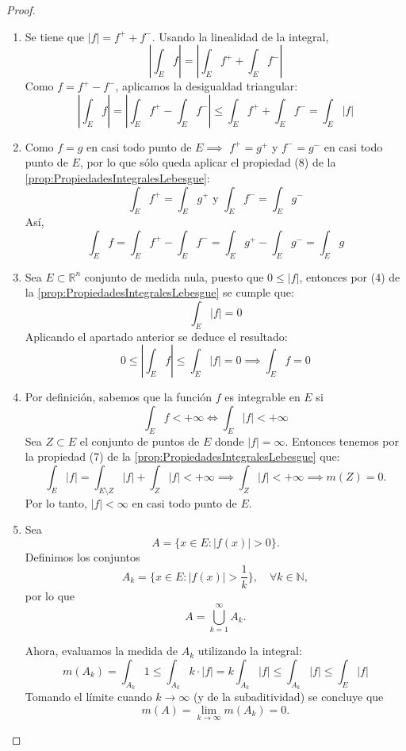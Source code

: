 \begin{proof}
\begin{enumerate}
        \item Se tiene que $|f| = f^+ + f^-$. Usando la linealidad de la integral, $$ \left|\int_E
                  f\right| = \left|\int_E f^+ + \int_E f^- \right| $$ Como $f = f^+ - f^-$, aplicamos la
              desigualdad triangular: $$ \left| \int_E f \right| = \left| \int_E f^+ - \int_E
                  f^- \right| \leq \int_E f^+ + \int_E f^- = \int_E |f| $$

        \item Como $f = g$ en casi todo punto de $E \implies$ $f^+ = g^+$ y $f^- = g^-$ en
              casi todo punto de $E$, por lo que sólo queda aplicar el propiedad (8) de la \cref{prop:PropiedadesIntegralesLebesgue}:
              $$ \int_E f^+ = \int_E g^+ \text{ y } \int_E f^- = \int_E g^-$$
              Así,
                $$ \int_E f = \int_E f^+ - \int_E f^- = \int_E g^+ - \int_E g^- = \int_E g $$

        \item Sea $E \subset \mathbb{R}^n$ conjunto de medida nula, puesto que $0 \leq |f|$, entonces por (4) de la \cref{prop:PropiedadesIntegralesLebesgue} se cumple que:
        $$ \int_E |f| = 0 $$
        Aplicando el apartado anterior se deduce el resultado:
        $$ 0 \leq \left|\int_{E}f \right| \leq \int_{E}|f| = 0 \implies \int_{E}f = 0 $$

        \item Por definición, sabemos que la función $f$ es integrable en $E$ si $$ \int_E f <
                  +\infty \iff \int_{E} |f| < +\infty$$ Sea $Z \subset E$ el conjunto de puntos
              de $E$ donde $|f| = \infty$. Entonces tenemos por la propiedad (7) de la \cref{prop:PropiedadesIntegralesLebesgue} que: $$ \int_E |f| = \int_{E
                      \setminus Z} |f| + \int_Z |f| < +\infty \implies \int_{Z} |f| < +\infty
                  \implies m(Z) = 0. $$ Por lo tanto, $|f| < \infty$ en casi todo punto de $E$.
        \item Sea $$ A = \{ x \in E : |f(x)| > 0 \}. $$ Definimos los conjuntos $$ A_k = \{ x
                  \in E : |f(x)| > \frac{1}{k} \}, \quad \forall k \in \mathbb{N}, $$ por lo que
              $$ A = \bigcup_{k=1}^{\infty} A_k. $$

              Ahora, evaluamos la medida de $ A_k $ utilizando la integral: $$ m(A_k) =
                  \int_{A_k} 1 \leq \int_{A_k} k \cdot |f| = k \int_{A_k} |f| \leq \int_{A_k} |f|
                  \leq \int_E |f|$$ Tomando el límite cuando $ k \to \infty $ (y de la
              subaditividad) se concluye que $$ m(A) = \lim_{k \to \infty} m(A_k) = 0. $$
    \end{enumerate}
\end{proof}
